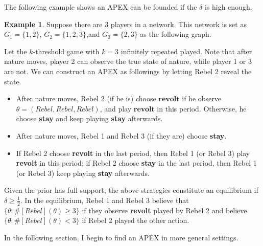\documentclass[12pt,letter]{article}
\theoremstyle{definition}
\newtheorem{example}{Example}[section]
\theoremstyle{remark}
\theoremstyle{claim}
\begin{document}
The following example shows an APEX can be founded if the $\delta$ is high enough.  
\begin{example}\label{ex_leading_ex}
Suppose there are 3 players in a network.  This network is set as $G_1=\{1,2\}$, $G_2=\{1,2,3\}$,and $G_3=\{2,3\}$ as the following graph.

\begin{center}
\end{center}

Let the $k$-threshold game with $k=3$ infinitely repeated played. Note that after nature moves, player 2 can observe the true state of nature, while player 1 or 3 are not. We can construct an APEX as followings by letting Rebel 2 reveal the state. 

\begin{itemize}
\item After nature moves, Rebel 2 (if he is) choose $\textbf{revolt}$ if he observe $\theta=(Rebel,Rebel,Rebel)$, and play \textbf{revolt} in this period. Otherwise, he choose \textbf{stay} and keep playing \textbf{stay} afterwards. 
\item After nature moves, Rebel 1 and Rebel 3 (if they are) choose \textbf{stay}.
\item If Rebel 2 choose \textbf{revolt} in the last period, then Rebel 1 (or Rebel 3) play \textbf{revolt} in this period; if Rebel 2 choose \textbf{stay} in the last period, then Rebel 1 (or Rebel 3) keep playing \textbf{stay} afterwards. 
\end{itemize}

Given the prior has full support, the above strategies constitute an equilibrium if $\delta\geq \frac{1}{2}$. In the equilibrium, Rebel 1 and Rebel 3 believe that $\{\theta:\#[Rebel](\theta)\geq 3\}$ if they observe \textbf{revolt} played by Rebel 2 and believe $\{\theta:\#[Rebel](\theta)< 3\}$ if Rebel 2 played the other action.
\end{example}

In the following section, I begin to find an APEX in more general settings.
\end{document}
